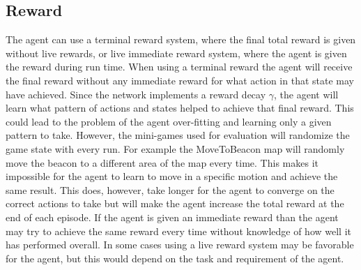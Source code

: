 \subsection{Reward}
The agent can use a terminal reward system, where the final total reward is given without live rewards, or live immediate reward system, where the agent is given the reward during run time. When using a terminal reward the agent will receive the final reward without any immediate reward for what action in that state may have achieved. Since the network implements a reward decay $\gamma$, the agent will learn what pattern of actions and states helped to achieve that final reward. This could lead to the problem of the agent over-fitting and learning only a given pattern to take. However, the mini-games used for evaluation will randomize the game state with every run. For example the MoveToBeacon map will randomly move the beacon to a different area of the map every time. This makes it impossible for the agent to learn to move in a specific motion and achieve the same result. This does, however, take longer for the agent to converge on the correct actions to take but will make the agent increase the total reward at the end of each episode. If the agent is given an immediate reward than the agent may try to achieve the same reward every time without knowledge of how well it has performed overall. In some cases using a live reward system may be favorable for the agent, but this would depend on the task and requirement of the agent. \cite{shelton2001balancing}